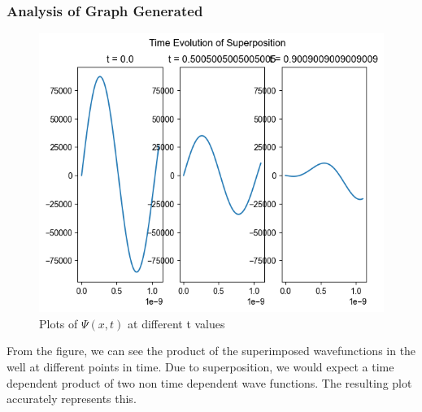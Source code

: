 \documentclass[a4paper,12pt]{article}
\begin{document}
\subsubsection{Analysis of Graph Generated}
\begin{figure}[H]
\includegraphics[width=\columnwidth]{report/figures/super_steps.png}
\caption{Plots of \(\Psi(x,t)\) at different t values}
\end{figure}
From the figure, we can see the product of the superimposed wavefunctions in the well at different points in time. Due to superposition, we would expect a time dependent product of two non time dependent wave functions. The resulting plot accurately represents this. 
\clearpage
\end{document}
